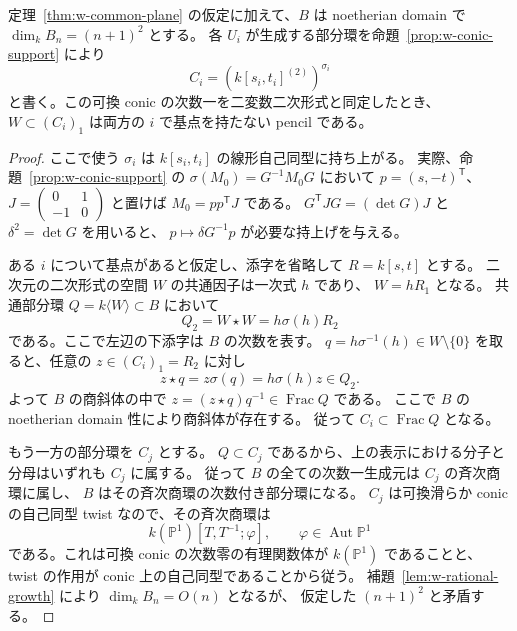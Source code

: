 \begin{lemma}
\label{lem:w-basepoint-free}
定理~\ref{thm:w-common-plane} の仮定に加えて、$B$ は noetherian domain で
$\dim_k B_n=(n+1)^2$ とする。
各 $U_i$ が生成する部分環を命題~\ref{prop:w-conic-support} により
\[
 C_i=(k[s_i,t_i]^{(2)})^{\sigma_i}
\]
と書く。この可換 conic の次数一を二変数二次形式と同定したとき、
$W\subset (C_i)_1$ は両方の $i$ で基点を持たない pencil である。
\end{lemma}
\begin{proof}
ここで使う $\sigma_i$ は $k[s_i,t_i]$ の線形自己同型に持ち上がる。
実際、命題~\ref{prop:w-conic-support} の
$\sigma(M_0)=G^{-1}M_0G$ において
$p=(s,-t)^{\mathsf T}$、$J=\left(\begin{smallmatrix}0&1\\-1&0\end{smallmatrix}\right)$
と置けば $M_0=pp^{\mathsf T}J$ である。
$G^{\mathsf T}JG=(\det G)J$ と $\delta^2=\det G$ を用いると、
$p\mapsto\delta G^{-1}p$ が必要な持上げを与える。

ある $i$ について基点があると仮定し、添字を省略して $R=k[s,t]$ とする。
二次元の二次形式の空間 $W$ の共通因子は一次式 $h$ であり、
$W=hR_1$ となる。
共通部分環 $Q=k\langle W\rangle\subset B$ において
\[
 Q_2=W\star W=h\sigma(h)R_2
\]
である。ここで左辺の下添字は $B$ の次数を表す。
$q=h\sigma^{-1}(h)\in W\setminus\{0\}$ を取ると、任意の $z\in(C_i)_1=R_2$ に対し
\[
 z\star q=z\sigma(q)=h\sigma(h)z\in Q_2.
\]
よって $B$ の商斜体の中で $z=(z\star q)q^{-1}\in\operatorname{Frac}Q$ である。
ここで $B$ の noetherian domain 性により商斜体が存在する。
従って $C_i\subset\operatorname{Frac}Q$ となる。

もう一方の部分環を $C_j$ とする。
$Q\subset C_j$ であるから、上の表示における分子と分母はいずれも $C_j$ に属する。
従って $B$ の全ての次数一生成元は $C_j$ の斉次商環に属し、
$B$ はその斉次商環の次数付き部分環になる。
$C_j$ は可換滑らか conic の自己同型 twist なので、その斉次商環は
\[
 k(\mathbb P^1)[T,T^{-1};\varphi],\qquad \varphi\in\operatorname{Aut}\mathbb P^1
\]
である。これは可換 conic の次数零の有理関数体が $k(\mathbb P^1)$ であることと、
twist の作用が conic 上の自己同型であることから従う。
補題~\ref{lem:w-rational-growth} により $\dim_k B_n=O(n)$ となるが、
仮定した $(n+1)^2$ と矛盾する。
\end{proof}

